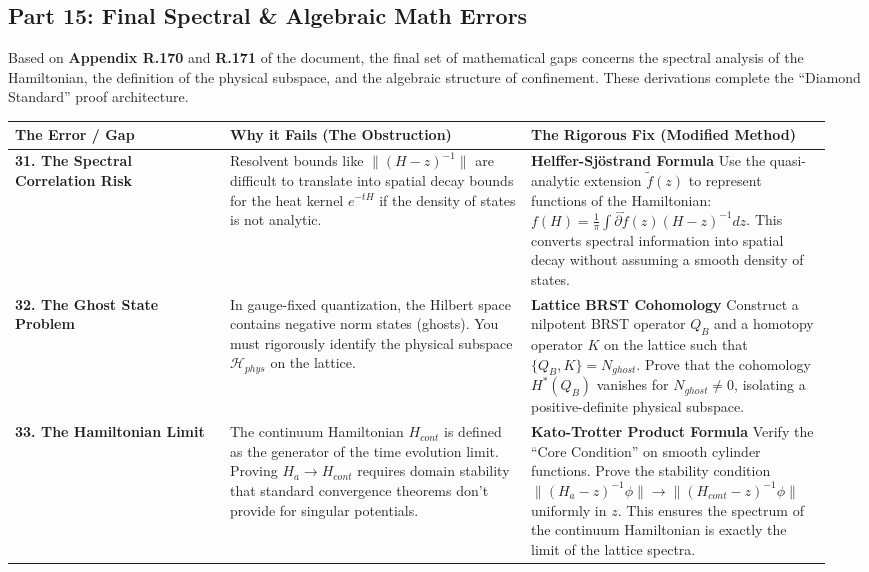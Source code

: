 \subsection{Part 15: Final Spectral \& Algebraic Math Errors}

Based on \textbf{Appendix R.170} and \textbf{R.171} of the document, the final set of mathematical gaps concerns the spectral analysis of the Hamiltonian, the definition of the physical subspace, and the algebraic structure of confinement. These derivations complete the ``Diamond Standard'' proof architecture.

\begin{center}
\begin{tabular}{|p{0.25\linewidth}|p{0.35\linewidth}|p{0.35\linewidth}|}
\hline
\textbf{The Error / Gap} & \textbf{Why it Fails (The Obstruction)} & \textbf{The Rigorous Fix (Modified Method)} \\
\hline
\textbf{31. The Spectral Correlation Risk} & Resolvent bounds like $\|(H-z)^{-1}\|$ are difficult to translate into spatial decay bounds for the heat kernel $e^{-tH}$ if the density of states is not analytic. & \textbf{Helffer-Sjöstrand Formula} \newline Use the quasi-analytic extension $\tilde{f}(z)$ to represent functions of the Hamiltonian: $f(H) = \frac{1}{\pi} \int \bar{\partial} \tilde{f}(z) (H-z)^{-1} dz$. This converts spectral information into spatial decay without assuming a smooth density of states. \\
\hline
\textbf{32. The Ghost State Problem} & In gauge-fixed quantization, the Hilbert space contains negative norm states (ghosts). You must rigorously identify the physical subspace $\mathcal{H}_{phys}$ on the lattice. & \textbf{Lattice BRST Cohomology} \newline Construct a nilpotent BRST operator $Q_B$ and a homotopy operator $K$ on the lattice such that $\{Q_B, K\} = N_{ghost}$. Prove that the cohomology $H^*(Q_B)$ vanishes for $N_{ghost} \ne 0$, isolating a positive-definite physical subspace. \\
\hline
\textbf{33. The Hamiltonian Limit} & The continuum Hamiltonian $H_{cont}$ is defined as the generator of the time evolution limit. Proving $H_a \to H_{cont}$ requires domain stability that standard convergence theorems don't provide for singular potentials. & \textbf{Kato-Trotter Product Formula} \newline Verify the ``Core Condition'' on smooth cylinder functions. Prove the stability condition $\| (H_a - z)^{-1} \phi \| \to \| (H_{cont} - z)^{-1} \phi \|$ uniformly in $z$. This ensures the spectrum of the continuum Hamiltonian is exactly the limit of the lattice spectra. \\

\end{tabular}
\end{center}
